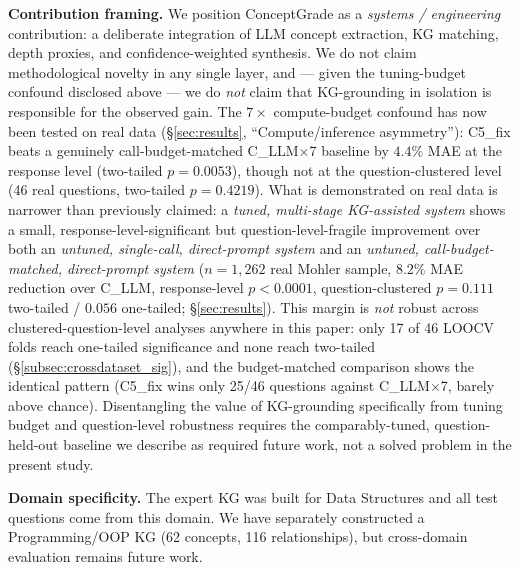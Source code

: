 \documentclass[conference]{IEEEtran}
\begin{document}
\textbf{Contribution framing.} We position ConceptGrade as a
\emph{systems / engineering} contribution: a deliberate integration of LLM
concept extraction, KG matching, depth proxies, and confidence-weighted
synthesis. We do not claim methodological novelty in any single layer, and
--- given the tuning-budget confound disclosed above --- we do \emph{not}
claim that KG-grounding in isolation is responsible for the observed gain.
The $7\times$ compute-budget confound has now been tested on real data
(\S\ref{sec:results}, ``Compute/inference asymmetry''): C5\_fix beats a
genuinely call-budget-matched C\_LLM$\times$7 baseline by $4.4\%$ MAE at
the response level (two-tailed $p=0.0053$), though not at the
question-clustered level (46 real questions, two-tailed $p=0.4219$).
What is demonstrated on real data is narrower than previously claimed: a
\emph{tuned, multi-stage KG-assisted system} shows a small,
response-level-significant but question-level-fragile improvement over
both an \emph{untuned, single-call, direct-prompt system} and an
\emph{untuned, call-budget-matched, direct-prompt system}
($n=1{,}262$ real Mohler sample, $8.2\%$ MAE reduction over C\_LLM,
response-level $p<0.0001$, question-clustered $p=0.111$ two-tailed /
$0.056$ one-tailed; \S\ref{sec:results}). This margin is \emph{not}
robust across clustered-question-level analyses anywhere in this paper:
only 17 of 46 LOOCV folds reach one-tailed significance and none reach
two-tailed (\S\ref{subsec:crossdataset_sig}), and the budget-matched
comparison shows the identical pattern (C5\_fix wins only 25/46
questions against C\_LLM$\times$7, barely above chance). Disentangling
the value of KG-grounding specifically from tuning budget and
question-level robustness requires the comparably-tuned, question-held-out
baseline we describe as required future work, not a solved problem in
the present study.

\textbf{Domain specificity.} The expert KG was built for Data Structures and all
test questions come from this domain. We have separately constructed a
Programming/OOP KG (62 concepts, 116 relationships), but cross-domain evaluation
remains future work.
\end{document}
